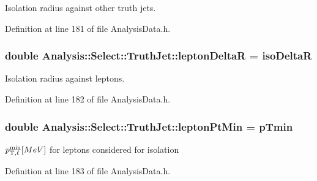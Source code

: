 Isolation radius against other truth jets. 



Definition at line 181 of file Analysis\+Data.\+h.

\subsubsection[{\texorpdfstring{lepton\+DeltaR}{leptonDeltaR}}]{\setlength{\rightskip}{0pt plus 5cm}double Analysis\+::\+Select\+::\+Truth\+Jet\+::lepton\+DeltaR = {\bf iso\+DeltaR}\hspace{0.3cm}{\ttfamily [static]}}\hypertarget{namespaceAnalysis_1_1Select_1_1TruthJet_a697911d5caa69806e031195dc61cade4}{}\label{namespaceAnalysis_1_1Select_1_1TruthJet_a697911d5caa69806e031195dc61cade4}


Isolation radius against leptons. 



Definition at line 182 of file Analysis\+Data.\+h.

\subsubsection[{\texorpdfstring{lepton\+Pt\+Min}{leptonPtMin}}]{\setlength{\rightskip}{0pt plus 5cm}double Analysis\+::\+Select\+::\+Truth\+Jet\+::lepton\+Pt\+Min = {\bf p\+Tmin}\hspace{0.3cm}{\ttfamily [static]}}\hypertarget{namespaceAnalysis_1_1Select_1_1TruthJet_ad6f1403d6765ca907d71e550adf59b0d}{}\label{namespaceAnalysis_1_1Select_1_1TruthJet_ad6f1403d6765ca907d71e550adf59b0d}


$ p_{{\rm T},\ell}^{\rm min} [MeV] $ for leptons considered for isolation 



Definition at line 183 of file Analysis\+Data.\+h.


